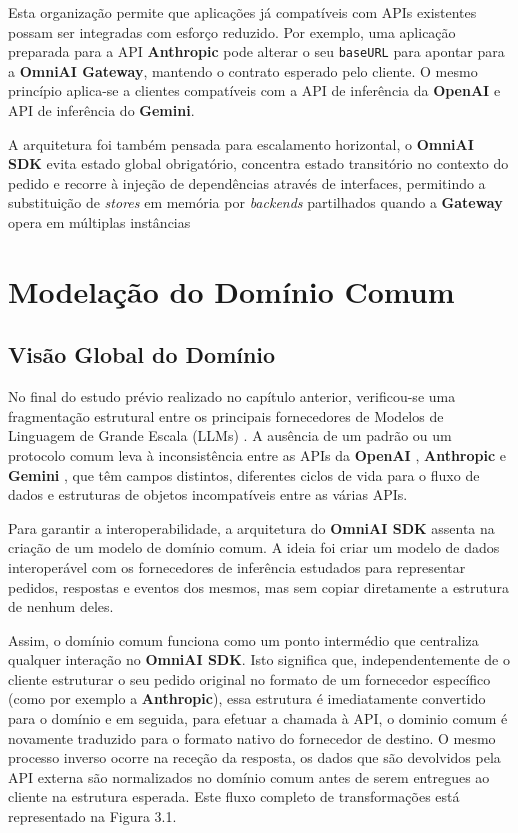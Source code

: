     Esta organização permite que aplicações já compatíveis com APIs existentes possam ser integradas com esforço reduzido. Por exemplo, uma aplicação preparada para a API \textbf{Anthropic} pode alterar o seu \texttt{baseURL} para apontar para a \textbf{OmniAI Gateway}, mantendo o contrato esperado pelo cliente. O mesmo princípio aplica-se a clientes compatíveis com a API de inferência da \textbf{OpenAI} e API de inferência do \textbf{Gemini}. 
    
    A arquitetura foi também pensada para escalamento horizontal, o \textbf{OmniAI SDK} evita estado global obrigatório, concentra estado transitório no contexto do pedido e recorre à injeção de dependências através de interfaces, permitindo a substituição de \textit{stores} em memória por \textit{backends} partilhados quando a \textbf{Gateway} opera em múltiplas instâncias

    \section{Modelação do Domínio Comum}

    \subsection{Visão Global do Domínio}

    No final do estudo prévio realizado no capítulo anterior, verificou-se uma fragmentação estrutural entre os principais fornecedores de Modelos de Linguagem de Grande Escala (LLMs) \cite{ibm_llm_topics}. A ausência de um padrão ou um protocolo comum leva à inconsistência entre as APIs da \textbf{OpenAI} \cite{openai_api}, \textbf{Anthropic} \cite{anthropic_api} e \textbf{Gemini} \cite{google_gemini_api}, que têm campos distintos, diferentes ciclos de vida para o fluxo de dados e estruturas de objetos incompatíveis entre as várias APIs.

    Para garantir a interoperabilidade, a arquitetura do \textbf{OmniAI SDK} assenta na criação de um modelo de domínio comum. A ideia foi criar um modelo de dados interoperável com os fornecedores de inferência estudados para representar pedidos, respostas e eventos dos mesmos, mas sem copiar diretamente a estrutura de nenhum deles.

   Assim, o domínio comum funciona como um ponto intermédio  que centraliza qualquer interação no \textbf{OmniAI SDK}. Isto significa que, independentemente de o cliente estruturar o seu pedido original no formato de um fornecedor específico (como por exemplo a \textbf{Anthropic}), essa estrutura é imediatamente convertido para o domínio e em seguida, para efetuar a chamada à API, o dominio comum é novamente traduzido para o formato nativo do fornecedor de destino. O mesmo processo inverso ocorre na receção da resposta, os dados que são devolvidos pela API externa são normalizados no domínio comum antes de serem entregues ao cliente na estrutura esperada. Este fluxo completo de transformações está representado na Figura 3.1.

